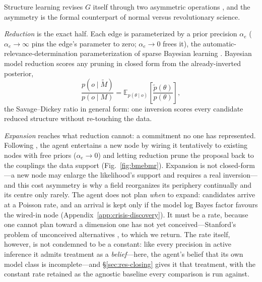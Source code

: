\documentclass[11pt]{article}
\newcommand{\Eq}[2]{\mathbb{E}_{#1}\!\left[#2\right]}
\begin{document}
Structure learning revises $G$ itself through two asymmetric operations
\citep{friston2017curiosity,smith2020structure}, and the asymmetry is the formal counterpart of normal
versus revolutionary science.

\emph{Reduction} is the exact half. Each edge is parameterized by a prior precision $\alpha_e$
($\alpha_e\to\infty$ pins the edge's parameter to zero; $\alpha_e\to0$ frees it), the
automatic-relevance-determination parameterization of sparse Bayesian learning
\citep{mackay1992,tipping2001}. Bayesian model reduction \citep{friston2011,friston2018bmr} scores any
pruning in closed form from the already-inverted posterior,
\begin{equation}
\frac{p(o\mid\tilde M)}{p(o\mid M)}=\Eq{p(\theta\mid o)}{\frac{\tilde p(\theta)}{p(\theta)}},
\label{eq:bmr}
\end{equation}
the Savage--Dickey ratio in general form: one inversion scores every candidate reduced structure
without re-touching the data.

\emph{Expansion} reaches what reduction cannot: a commitment no one has represented. Following
\citet{friston2017curiosity}, the agent entertains a new node by wiring it tentatively to existing
nodes with free priors ($\alpha_e\to0$) and letting reduction prune the proposal back to the couplings
the data support (Fig.~\ref{fig:bmebmr}). Expansion is not closed-form---a new node may enlarge the
likelihood's support and requires a real inversion---and this cost asymmetry is why a field
reorganizes its periphery continually and its centre only rarely. The agent does not plan \emph{when}
to expand: candidates arrive at a Poisson rate, and an arrival is kept only if the model log Bayes
factor favours the wired-in node (Appendix~\ref{app:crisis-discovery}). It must be a rate,
because one cannot plan toward a dimension one has not yet conceived---Stanford's problem of
unconceived alternatives \citep{stanford2006}, to which we return. The rate itself, however, is
not condemned to be a constant: like every precision in active inference it admits treatment as a
\emph{belief}---here, the agent's belief that its own model class is incomplete---and
\S\ref{sec:res-closing} gives it that treatment, with the constant rate retained as the agnostic
baseline every comparison is run against.
\end{document}
